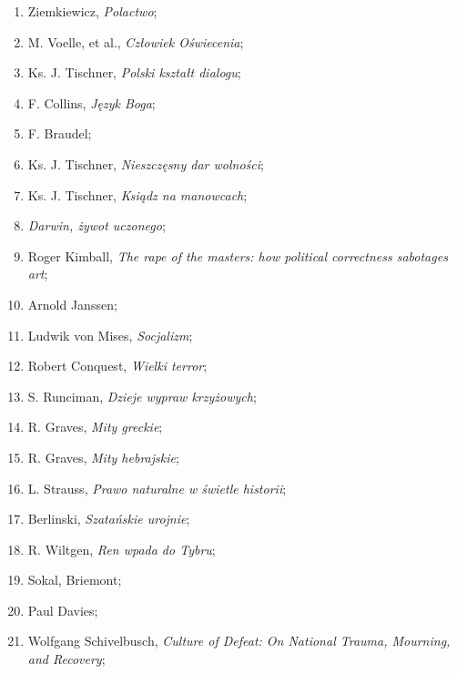 \documentclass[a4paper,11pt]{article}
\begin{document}
\begin{enumerate}
\item Ziemkiewicz, \textit{Polactwo};

\item M. Voelle, et al., \textit{Człowiek Oświecenia};

\item Ks. J. Tischner, \textit{Polski kształt dialogu};

\item F. Collins, \textit{Język Boga};

\item F. Braudel;

\item Ks. J. Tischner, \textit{Nieszczęsny dar wolności};

\item Ks. J. Tischner, \textit{Ksiądz na manowcach};

\item \textit{Darwin, żywot uczonego};

\item Roger Kimball, \textit{The rape of the masters: how political
    correctness sabotages art};

\item Arnold Janssen;

\item Ludwik von Mises, \textit{Socjalizm};

\item Robert Conquest, \textit{Wielki terror};

\item S. Runciman, \textit{Dzieje wypraw krzyżowych};

\item R. Graves, \textit{Mity greckie};

\item R. Graves, \textit{Mity hebrajskie};

\item L. Strauss, \textit{Prawo naturalne w świetle historii};

\item Berlinski, \textit{Szatańskie urojnie};

\item R. Wiltgen, \textit{Ren wpada do Tybru};

\item Sokal, Briemont;

\item Paul Davies;

\item Wolfgang Schivelbusch, \textit{Culture of Defeat: On National
    Trauma, Mourning, and Recovery};


\end{enumerate}
\end{document}
